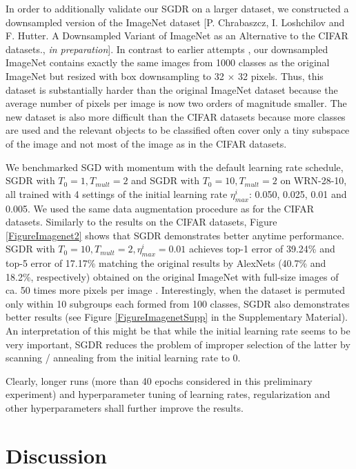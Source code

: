 \documentclass{article}
\begin{document}
In order to additionally validate our SGDR on a larger dataset, we constructed a downsampled version of the ImageNet dataset [P. Chrabaszcz, I. Loshchilov and F. Hutter. {A Downsampled Variant of ImageNet as an Alternative to the CIFAR datasets.}, \textit{in preparation}]. In contrast to earlier attempts \citep{TinyImagenet}, our downsampled ImageNet contains exactly the same images from 1000 classes as the original ImageNet but resized with box downsampling to 32 $\times$ 32 pixels. Thus, this dataset is substantially harder than the original ImageNet dataset because the average number of pixels per image is now two orders of magnitude smaller. The new dataset is also more difficult than the CIFAR datasets because more classes are used and the relevant objects to be classified often cover only a tiny subspace of the image and not most of the image as in the CIFAR datasets. 

We benchmarked SGD with momentum with the default learning rate schedule, SGDR with $T_0=1, T_{mult}=2$ and SGDR with $T_0=10, T_{mult}=2$ on WRN-28-10, all trained with 4 settings of the initial learning rate $\eta^i_{max}$: 0.050, 0.025, 0.01 and 0.005. We used the same data augmentation procedure as for the CIFAR datasets. 
Similarly to the results on the CIFAR datasets, Figure \ref{FigureImagenet2} shows that SGDR demonstrates better anytime performance. SGDR with $T_0=10, T_{mult}=2, \eta^i_{max}=0.01$ achieves top-1 error of 39.24\% and top-5 error of 17.17\% matching the original results by AlexNets (40.7\% and 18.2\%, respectively) obtained on the original ImageNet with full-size images of ca. 50 times more pixels per image \citep{krizhevsky2012imagenet}. 
Interestingly, when the dataset is permuted only within 10 subgroups each formed from 100 classes, SGDR also demonstrates better results (see Figure \ref{FigureImagenetSupp} in the Supplementary Material). An interpretation of this might be that while the initial learning rate seems to be very important, SGDR reduces the problem of improper selection of the latter by scanning / annealing from the initial learning rate to 0. 

Clearly, longer runs (more than 40 epochs considered in this preliminary experiment) and hyperparameter tuning of learning rates, regularization and other hyperparameters shall further improve the results. 

\section{Discussion}
\end{document}
